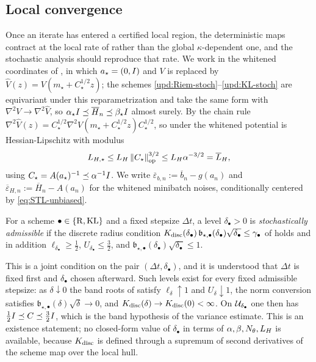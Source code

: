 \subsection{Local convergence}
\label{subsec:stoch-local}

Once an iterate has entered a certified local region, the deterministic maps contract at the local
rate of  rather than the global $\kappa$-dependent one, and the stochastic analysis
should reproduce that rate. We work in the whitened coordinates of , in which
$a_\star=(0,I)$ and $V$ is replaced by $\widehat V(z)=V(m_\star+C_\star^{1/2}z)$; the schemes
\eqref{upd:Riem-stoch}--\eqref{upd:KL-stoch} are equivariant under this reparametrization and take the
same form with $\nabla^2V\to\nabla^2\widehat V$, so
$\alpha_\star I\preceq\overline H_n\preceq\beta_\star I$ almost surely. By the chain rule
$\nabla^2\widehat V(z)=C_\star^{1/2}\nabla^2V(m_\star+C_\star^{1/2}z)C_\star^{1/2}$, so under
 the whitened potential is Hessian-Lipschitz with modulus
\begin{equation}
\label{eq:LHs}
    L_{H,\star}\leq L_H\left\lVert C_\star\right\rVert_{\mathrm{op}}^{3/2}\leq L_H\alpha^{-3/2}=\overline{L}_H ,
\end{equation}
using $C_\star=A(a_\star)^{-1}\preceq\alpha^{-1}I$. We write
$\overline\varepsilon_{b,n}:=\overline b_n-g(a_n)$ and
$\overline\varepsilon_{H,n}:=\overline H_n-A(a_n)$ for the whitened minibatch noises, conditionally
centered by \eqref{eq:STL-unbiased}.

\begin{definition}
\label{def:stoch-admissible}
For a scheme $\bullet\in\{\mathrm{R},\mathrm{KL}\}$ and a fixed stepsize $\Delta t$, a level $\delta_\bullet>0$ is
\emph{stochastically admissible} if the discrete radius condition
$K_{\mathrm{disc}}(\delta_\bullet)\,\mathfrak b_{\star,\bullet}(\delta_\bullet)\sqrt{\delta_\bullet}\leq\gamma_\bullet$
of  holds and in addition
$\ell_{\delta_\bullet}\geq\tfrac12$, $U_{\delta_\bullet}\leq\tfrac32$, and
$\mathfrak b_{\star,\bullet}(\delta_\bullet)\sqrt{\delta_\bullet}\leq1$.
\end{definition}

This is a joint condition on the pair $(\Delta t,\delta_\bullet)$, and it is understood that
$\Delta t$ is fixed first and $\delta_\bullet$ chosen afterward. Such levels exist for every fixed
admissible stepsize: as $\delta\downarrow0$ the band roots of  satisfy
$\ell_\delta\uparrow1$ and $U_\delta\downarrow1$, the norm conversion satisfies
$\mathfrak b_{\star,\bullet}(\delta)\sqrt\delta\to0$, and $K_{\mathrm{disc}}(\delta)\to K_{\mathrm{disc}}(0)<\infty$. On
$\mathcal{U}_{\delta_\bullet}$ one then has $\tfrac12I\preceq C\preceq\tfrac32I$, which is the band
hypothesis of the variance estimate. This is an existence statement; no closed-form value of
$\delta_\bullet$ in terms of $\alpha,\beta,N_\theta,L_H$ is available, because $K_{\mathrm{disc}}$ is defined
through a supremum of second derivatives of the scheme map over the local hull.

